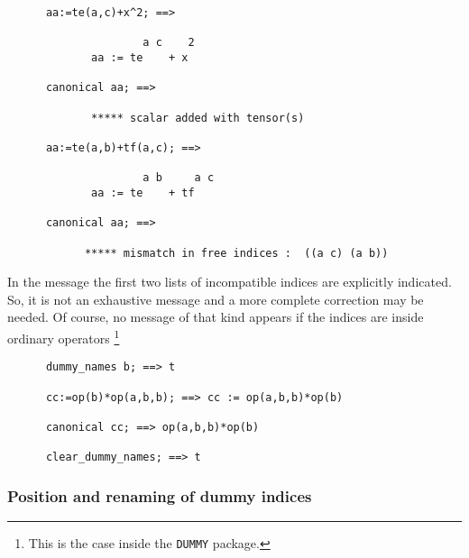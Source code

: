 \begin{verbatim}
      aa:=te(a,c)+x^2; ==>

                     a c    2
             aa := te    + x

      canonical aa; ==>

             ***** scalar added with tensor(s)

      aa:=te(a,b)+tf(a,c); ==>

                     a b     a c
             aa := te    + tf

      canonical aa; ==>

            ***** mismatch in free indices :  ((a c) (a b))
\end{verbatim}
In the message the first two lists of incompatible indices are
explicitly indicated. So, it is not an exhaustive message and a more
complete correction may be needed.
Of course, no message of that kind appears if the indices are inside
ordinary operators%
\footnote{This is the case inside the \texttt{DUMMY} package.}
\begin{verbatim}
      dummy_names b; ==> t

      cc:=op(b)*op(a,b,b); ==> cc := op(a,b,b)*op(b)

      canonical cc; ==> op(a,b,b)*op(b)

      clear_dummy_names; ==> t
\end{verbatim}
\subsubsection{Position and renaming of dummy indices}

